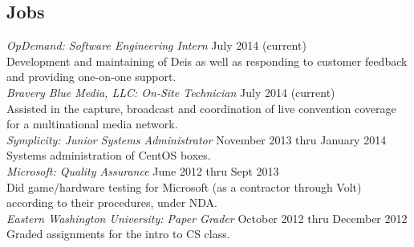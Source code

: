 \documentclass[line, margin]{res}
\begin{document}
\begin{resume}
	\section{Jobs}
	\textit{OpDemand: Software Engineering Intern} \hfill July 2014 (current) \\
	Development and maintaining of Deis as well as responding to customer
	feedback and providing one-on-one support. \\ [6pt]
	\textit{Bravery Blue Media, LLC: On-Site Technician} \hfill July 2014 (current) \\
	Assisted in the capture, broadcast and coordination of live convention
	coverage for a multinational media network. \\ [6pt]
	\textit{Symplicity: Junior Systems Administrator} \hfill November 2013 thru January 2014 \\
	Systems administration of CentOS boxes. \\ [6pt]
	\textit{Microsoft: Quality Assurance} \hfill June 2012 thru Sept 2013 \\
	Did game/hardware testing for Microsoft (as a contractor through Volt)
	according to their procedures, under NDA. \\ [6pt]
	\textit{Eastern Washington University: Paper Grader} \hfill October 2012 thru December 2012 \\
	Graded assignments for the intro to CS class. \\ [12pt]

\end{resume}
\end{document}
